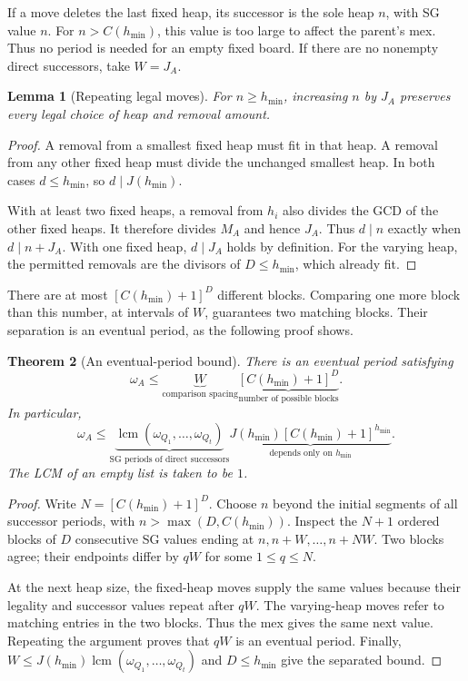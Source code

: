 \documentclass[10pt,a4paper]{article}
\newtheorem{theorem}{Theorem}[section]
\newtheorem{lemma}[theorem]{Lemma}
\begin{document}
If a move deletes the last fixed heap, its successor is the sole
heap $n$, with SG value $n$. For $n>C(h_{\min})$, this value is
too large to affect the parent's mex. Thus no period is needed
for an empty fixed board. If there are no nonempty direct
successors, take $W=J_A$.

\begin{lemma}[Repeating legal moves]
\label{lem:legality}
For $n\ge h_{\min}$, increasing $n$ by $J_A$ preserves every
legal choice of heap and removal amount.
\end{lemma}
\begin{proof}
A removal from a smallest fixed heap must fit in that heap.
A removal from any other fixed heap must divide the unchanged
smallest heap. In both cases $d\le h_{\min}$, so
$d\mid J(h_{\min})$.

With at least two fixed heaps, a removal from $h_i$ also divides
the GCD of the other fixed heaps. It therefore divides $M_A$
and hence $J_A$. Thus $d\mid n$ exactly when $d\mid n+J_A$.
With one fixed heap, $d\mid J_A$ holds by definition.
For the varying heap, the permitted removals are the divisors
of $D\le h_{\min}$, which already fit.
\end{proof}

There are at most $[C(h_{\min})+1]^D$ different blocks.
Comparing one more block than this number, at intervals of
$W$, guarantees two matching blocks. Their separation is an
eventual period, as the following proof shows.

\begin{theorem}[An eventual-period bound]
\label{thm:period}
There is an eventual period satisfying
\begin{equation}
 \boxed{\omega_A\le
 \underbrace{W}_{\text{comparison spacing}}
 \underbrace{[C(h_{\min})+1]^D}_{\text{number of possible blocks}}.}
 \label{eq:periodfine}
\end{equation}
In particular,
\begin{equation}
 \boxed{\omega_A\le
 \underbrace{\operatorname{lcm}(\omega_{Q_1},\ldots,\omega_{Q_t})}_{
 \text{SG periods of direct successors}}
 \underbrace{J(h_{\min})[C(h_{\min})+1]^{h_{\min}}}_{
 \text{depends only on }h_{\min}}.}
 \label{eq:periodseparated}
\end{equation}
The LCM of an empty list is taken to be $1$.
\end{theorem}
\begin{proof}
Write $N=[C(h_{\min})+1]^D$. Choose $n$ beyond the initial
segments of all successor periods, with $n>\max(D,C(h_{\min}))$.
Inspect the $N+1$ ordered blocks of $D$ consecutive SG values
ending at $n,n+W,\ldots,n+NW$. Two blocks agree; their endpoints
differ by $qW$ for some $1\le q\le N$.

At the next heap size, the fixed-heap moves supply the same values
because their legality and successor values repeat after $qW$.
The varying-heap moves refer to matching entries in the two blocks.
Thus the mex gives the same next value. Repeating the argument
proves that $qW$ is an eventual period. Finally,
$W\le J(h_{\min})\operatorname{lcm}(\omega_{Q_1},\ldots,\omega_{Q_t})$
and $D\le h_{\min}$ give the separated bound.
\end{proof}
\end{document}
